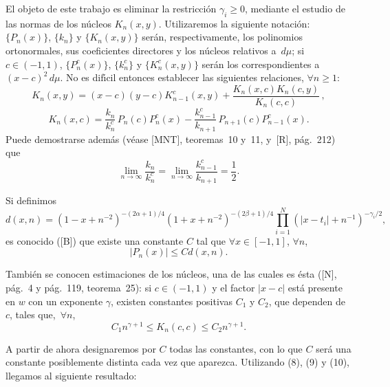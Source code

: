 \documentclass[a4paper,12pt]{article}
\theoremstyle{plain}
\theoremstyle{definition}
\begin{document}
El objeto de este trabajo es eliminar la restricci\'on $\gamma_{i} \geq 0$,
mediante el estudio de las normas de los n\'ucleos $K_{n}(x,y)$.
Utilizaremos la siguiente notaci\'on: $\{P_{n}(x)\}$, $\{k_{n}\}$ y
$\{K_{n}(x,y)\}$ ser\'an, respectivamente, los polinomios
ortonormales, sus coeficientes directores y los n\'ucleos relativos
a~$d\mu$; si $c \in (-1,1)$, $\{P_{n}^{c}(x)\}$,
$\{k_{n}^{c}\}$ y $\{K_{n}^{c}(x,y)\}$ ser\'an
los correspondientes a $(x-c)^{2}\,d\mu$.
No es dif\'{\i}cil entonces establecer las siguientes relaciones,
$\forall n \geq 1$:
\begin{equation}
K_{n}(x,y) = (x-c) (y-c) K_{n-1}^{c}(x,y)
+ \frac{K_{n}(x,c)K_{n}(c,y)}{K_{n}(c,c)}\,,
\tag{7}
\end{equation}
\begin{equation}
K_{n}(x,c) = \frac{k_{n}}{k_{n}^{c}}\, P_{n}(c) P_{n}^{c}(x)
- \frac{k_{n-1}^{c}}{k_{n+1}}\, P_{n+1}(c) P_{n-1}^{c}(x).
\tag{8}
\end{equation}
Puede demostrarse adem\'as (v\'{e}ase [MNT], teoremas~10 y~11,
y~[R], p\'ag.~212) que
\begin{equation}
\lim_{n \to \infty} \frac{k_{n}}{k_{n}^{c}}
= \lim_{n \to \infty} \frac{k_{n-1}^{c}}{k_{n+1}}
= \frac{1}{2}.
\tag{9}
\end{equation}

Si definimos
$$
d(x,n) = (1 - x + n^{-2})^{-(2\alpha+1)/4}
(1 + x + n^{-2})^{-(2\beta+1)/4}
\prod_{i=1}^{N} ( | x-t_{i}| + n^{-1})^{-\gamma_{i}/2},
$$
es conocido ([B]) que existe una constante $C$ tal que
$\forall x \in [-1,1]$, $\forall n$,
\begin{equation}
| P_{n}(x) | \leq C d(x,n).
\tag{10}
\end{equation}

Tambi\'{e}n se conocen estimaciones de los n\'ucleos, una de las
cuales es \'esta ([N], p\'ag.~4 y p\'ag.~119, teorema~25): si
$c \in (-1,1)$ y el factor $| x - c |$
est\'a presente en $w$ con un exponente $\gamma$, existen constantes
positivas $C_{1}$ y $C_{2}$, que dependen de $c$,
tales que,~$\forall n$,
\begin{equation}
C_{1} n^{\gamma+1} \leq K_{n}(c,c) \leq C_{2} n^{\gamma+1}.
\tag{11}
\end{equation}

A partir de ahora designaremos por $C$ todas las constantes, con
lo que $C$ ser\'a una constante posiblemente distinta cada vez
que aparezca. Utilizando (8), (9) y (10), llegamos al siguiente
resultado:
\end{document}
